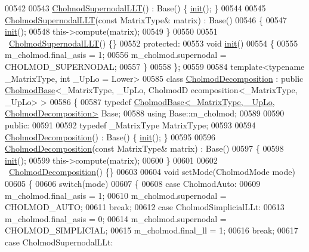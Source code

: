 \begin{DoxyCode}
00542     
00543     \hyperlink{class_eigen_1_1_cholmod_supernodal_l_l_t}{CholmodSupernodalLLT}() : Base() \{ \hyperlink{structinit}{init}(); \}
00544 
00545     \hyperlink{class_eigen_1_1_cholmod_supernodal_l_l_t}{CholmodSupernodalLLT}(\textcolor{keyword}{const} MatrixType& matrix) : Base()
00546     \{
00547       \hyperlink{structinit}{init}();
00548       this->compute(matrix);
00549     \}
00550 
00551     ~\hyperlink{class_eigen_1_1_cholmod_supernodal_l_l_t}{CholmodSupernodalLLT}() \{\}
00552   \textcolor{keyword}{protected}:
00553     \textcolor{keywordtype}{void} \hyperlink{structinit}{init}()
00554     \{
00555       m\_cholmod.final\_asis = 1;
00556       m\_cholmod.supernodal = CHOLMOD\_SUPERNODAL;
00557     \}
00558 \};
00559 
00584 \textcolor{keyword}{template}<\textcolor{keyword}{typename} \_MatrixType, \textcolor{keywordtype}{int} \_UpLo = Lower>
00585 \textcolor{keyword}{class }\hyperlink{class_eigen_1_1_cholmod_decomposition}{CholmodDecomposition} : \textcolor{keyword}{public} \hyperlink{class_eigen_1_1_cholmod_base}{CholmodBase}<\_MatrixType, \_UpLo, CholmodD
      ecomposition<\_MatrixType, \_UpLo> >
00586 \{
00587     \textcolor{keyword}{typedef} \hyperlink{class_eigen_1_1_cholmod_base}{CholmodBase<\_MatrixType, \_UpLo, CholmodDecomposition>}
       Base;
00588     \textcolor{keyword}{using} Base::m\_cholmod;
00589     
00590   \textcolor{keyword}{public}:
00591     
00592     \textcolor{keyword}{typedef} \_MatrixType MatrixType;
00593     
00594     \hyperlink{class_eigen_1_1_cholmod_decomposition}{CholmodDecomposition}() : Base() \{ \hyperlink{structinit}{init}(); \}
00595 
00596     \hyperlink{class_eigen_1_1_cholmod_decomposition}{CholmodDecomposition}(\textcolor{keyword}{const} MatrixType& matrix) : Base()
00597     \{
00598       \hyperlink{structinit}{init}();
00599       this->compute(matrix);
00600     \}
00601 
00602     ~\hyperlink{class_eigen_1_1_cholmod_decomposition}{CholmodDecomposition}() \{\}
00603     
00604     \textcolor{keywordtype}{void} setMode(CholmodMode mode)
00605     \{
00606       \textcolor{keywordflow}{switch}(mode)
00607       \{
00608         \textcolor{keywordflow}{case} CholmodAuto:
00609           m\_cholmod.final\_asis = 1;
00610           m\_cholmod.supernodal = CHOLMOD\_AUTO;
00611           \textcolor{keywordflow}{break};
00612         \textcolor{keywordflow}{case} CholmodSimplicialLLt:
00613           m\_cholmod.final\_asis = 0;
00614           m\_cholmod.supernodal = CHOLMOD\_SIMPLICIAL;
00615           m\_cholmod.final\_ll = 1;
00616           \textcolor{keywordflow}{break};
00617         \textcolor{keywordflow}{case} CholmodSupernodalLLt:

\end{DoxyCode}
